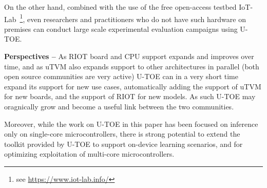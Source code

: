 On the other hand, combined with the use of the free open-access testbed IoT-Lab~\footnote{see \url{https://www.iot-lab.info/}}, even researchers and practitioners who do not have such hardware on premises can conduct large scale experimental evaluation campaigns using U-TOE.

{\bf Perspectives --} As RIOT board and CPU support expands and improves over time, and as uTVM also expands support to other architectures in parallel (both open source communities are very active) U-TOE can in a very short time expand its support for new use cases, automatically adding the support of uTVM for new boards, and the support of RIOT for new models. As such U-TOE may oragnically grow and become a useful link between the two communities.

Moreover, while the work on U-TOE in this paper has been focused on inference only on single-core microcontrollers, there is strong potential to extend the toolkit provided by U-TOE to support on-device learning scenarios, and for optimizing exploitation of multi-core microcontrollers.

